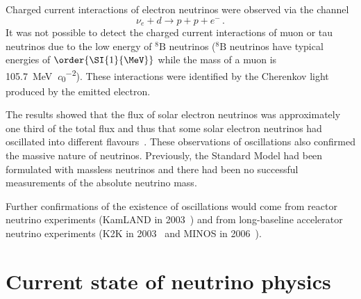 Charged current interactions of electron neutrinos were observed via the channel
\begin{equation}
  \nu_{e} + d \rightarrow p + p + e^{-} \, .
\end{equation}
It was not possible to detect the charged current interactions of muon or tau neutrinos due to the low energy of $^{8}\text{B}$ neutrinos ($^{8}\text{B}$ neutrinos have typical energies of $\order{\SI{1}{\MeV}}$ while the mass of a muon is \SI{105.7}{\MeV\per\clight\squared}).
These interactions were identified by the Cherenkov light produced by the emitted electron.

The results showed that the flux of solar electron neutrinos was approximately one third of the total flux and thus that some solar electron neutrinos had oscillated into different flavours~\cite{SNO}.
These observations of oscillations also confirmed the massive nature of neutrinos. 
Previously, the Standard Model had been formulated with massless neutrinos and there had been no successful measurements of the absolute neutrino mass.

Further confirmations of the existence of oscillations would come from reactor neutrino experiments (KamLAND in 2003~\cite{kamland2003}) and from long-baseline accelerator neutrino experiments (K2K in 2003~\cite{k2kDisapp} and MINOS in 2006~\cite{minosDisapp}).

\section{Current state of neutrino physics}
\label{sec:theory:currentState}

